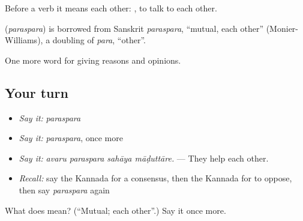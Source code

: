 Before a verb it means each other:  , to talk to each other.

\begin{cousinweb}
\textbf{} (\emph{paraspara}) is borrowed from Sanskrit \emph{paraspara}, \textquotedblleft{}mutual, each other\textquotedblright{} (Monier-Williams), a doubling of \emph{para}, \textquotedblleft{}other\textquotedblright{}.
\end{cousinweb}

\begin{grammarlens}[title={What you've built}]
One more word for giving reasons and opinions.
\end{grammarlens}

\subsection*{Your turn}
\begin{itemize}
\raggedright
  \item \emph{Say it:} \emph{paraspara}
  \item \emph{Say it:} \emph{paraspara}, once more
  \item \emph{Say it:} \emph{avaru paraspara sahāya māḍuttāre.} — They help each other.
  \item \emph{Recall:} say the Kannada for a consensus, then the Kannada for to oppose, then say \emph{paraspara} again
\end{itemize}

\begin{tcolorbox}[breakable,colback=teal!4,colframe=teal!35!black,title={Before you move on}]
What does  mean? (\textquotedblleft{}Mutual; each other\textquotedblright{}.) Say it once more.
\end{tcolorbox}
